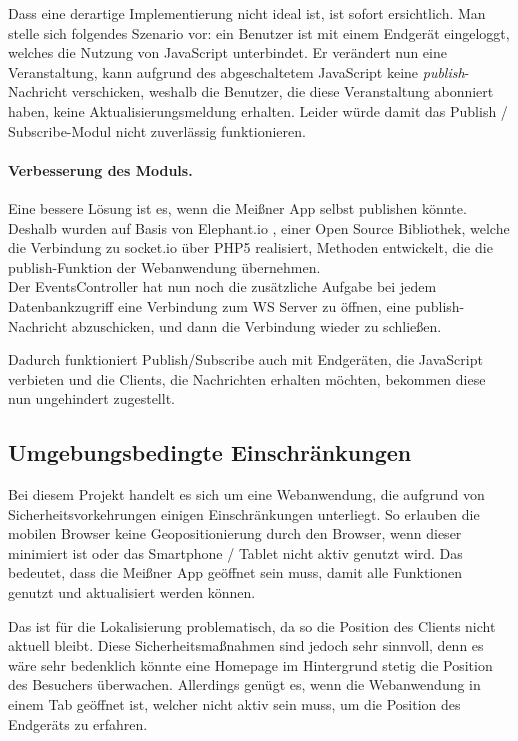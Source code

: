 Dass eine derartige Implementierung nicht ideal ist, ist sofort ersichtlich. Man stelle sich folgendes Szenario vor: ein Benutzer ist mit einem Endgerät eingeloggt, welches die Nutzung von JavaScript unterbindet. Er verändert nun eine Veranstaltung, kann aufgrund des abgeschaltetem JavaScript keine \emph{publish}-Nachricht verschicken, weshalb die Benutzer, die diese Veranstaltung abonniert haben, keine Aktualisierungsmeldung erhalten. Leider würde damit das Publish / Subscribe-Modul nicht zuverlässig funktionieren.

\paragraph{Verbesserung des Moduls.}
Eine bessere Lösung ist es, wenn die Meißner App selbst publishen könnte. Deshalb wurden auf Basis von Elephant.io \cite{elephant.io}, einer Open Source Bibliothek, welche die Verbindung zu socket.io über PHP5 realisiert, Methoden entwickelt, die die publish-Funktion der Webanwendung übernehmen.\\
Der EventsController hat nun noch die zusätzliche Aufgabe bei jedem Datenbankzugriff eine Verbindung zum WS Server zu öffnen, eine publish-Nachricht abzuschicken, und dann die Verbindung wieder zu schließen.\par

Dadurch funktioniert Publish/Subscribe auch mit Endgeräten, die JavaScript verbieten und die Clients, die Nachrichten erhalten möchten, bekommen diese nun ungehindert zugestellt.

\subsection{Umgebungsbedingte Einschränkungen}
Bei diesem Projekt handelt es sich um eine Webanwendung, die aufgrund von Sicherheitsvorkehrungen einigen Einschränkungen unterliegt. So erlauben die mobilen Browser keine Geopositionierung durch den Browser, wenn dieser minimiert ist oder das Smartphone / Tablet nicht aktiv genutzt wird. Das bedeutet, dass die Meißner App geöffnet sein muss, damit alle Funktionen genutzt und aktualisiert werden können.\par

Das ist für die Lokalisierung problematisch, da so die Position des Clients nicht aktuell bleibt. Diese Sicherheitsmaßnahmen sind jedoch sehr sinnvoll, denn es wäre sehr bedenklich könnte eine Homepage im Hintergrund stetig die Position des Besuchers überwachen. Allerdings genügt es, wenn die Webanwendung in einem Tab geöffnet ist, welcher nicht aktiv sein muss, um die Position des Endgeräts zu erfahren.


